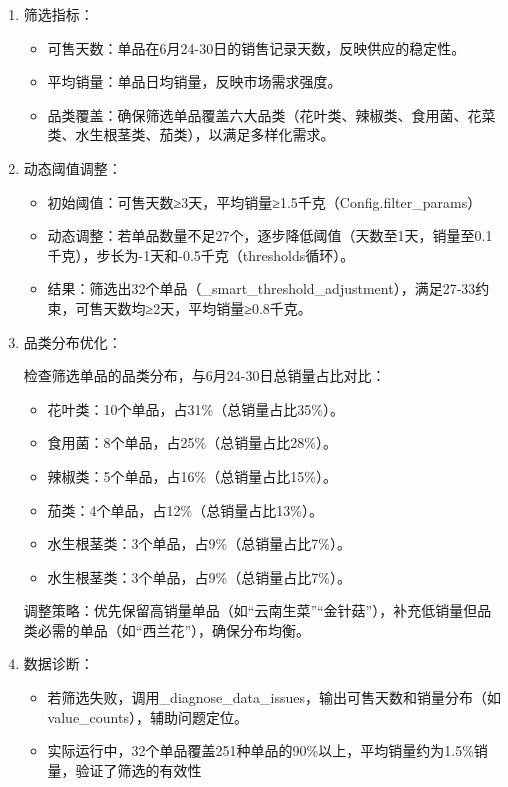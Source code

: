 \documentclass{cumcmthesis} %
\begin{document}
\begin{enumerate}
    \item 筛选指标：
    \begin{itemize}
        \item 可售天数：单品在6月24-30日的销售记录天数，反映供应的稳定性。
        \item 平均销量：单品日均销量，反映市场需求强度。
        \item 品类覆盖：确保筛选单品覆盖六大品类（花叶类、辣椒类、食用菌、花菜类、水生根茎类、茄类），以满足多样化需求。
    \end{itemize}
    
    \item 动态阈值调整：
    \begin{itemize}
        \item 初始阈值：可售天数≥3天，平均销量≥1.5千克（Config.filter\_params）
        \item 动态调整：若单品数量不足27个，逐步降低阈值（天数至1天，销量至0.1千克），步长为-1天和-0.5千克（thresholds循环）。
        \item 结果：筛选出32个单品（\_smart\_threshold\_adjustment），满足27-33约束，可售天数均≥2天，平均销量≥0.8千克。
    \end{itemize}
    
    \item 品类分布优化：
    

    检查筛选单品的品类分布，与6月24-30日总销量占比对比：
    \begin{itemize}
        \item 花叶类：10个单品，占31\%（总销量占比35\%）。
        \item 食用菌：8个单品，占25\%（总销量占比28\%）。
        \item 辣椒类：5个单品，占16\%（总销量占比15\%）。
        \item 茄类：4个单品，占12\%（总销量占比13\%）。
        \item 水生根茎类：3个单品，占9\%（总销量占比7\%）。
        \item 水生根茎类：3个单品，占9\%（总销量占比7\%）。
    \end{itemize}
    调整策略：优先保留高销量单品（如“云南生菜”“金针菇”），补充低销量但品类必需的单品（如“西兰花”），确保分布均衡。

    \item 数据诊断：
    \begin{itemize}
    
        \item 若筛选失败，调用\_diagnose\_data\_issues，输出可售天数和销量分布（如value\_counts），辅助问题定位。
        \item 实际运行中，32个单品覆盖251种单品的90\%以上，平均销量约为1.5\%销量，验证了筛选的有效性
    
    \end{itemize}
\end{enumerate}
\end{document}
